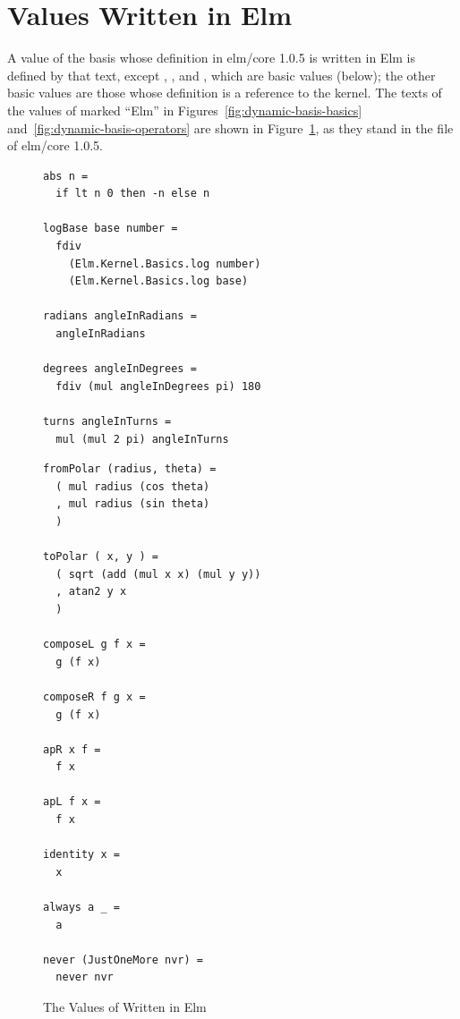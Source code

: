 \section{Values Written in Elm}\label{sec:appendix-dynamic-basis-elm}

A value of the basis whose definition in elm/core 1.0.5 is written in Elm is
defined by that text, except , ,  and
, which are basic values (below); the other basic values are
those whose definition is a reference to the kernel. %
The texts of the values of  marked ``Elm'' in
Figures~\ref{fig:dynamic-basis-basics} and~\ref{fig:dynamic-basis-operators}
are shown in Figure~\ref{fig:dynamic-basis-elm}, as they stand in the file
 of elm/core 1.0.5.

\begin{figure}[htbp]
\centering
\small
\begin{minipage}[t]{0.48\textwidth}
\footnotesize
\begin{verbatim}
abs n =
  if lt n 0 then -n else n

logBase base number =
  fdiv
    (Elm.Kernel.Basics.log number)
    (Elm.Kernel.Basics.log base)

radians angleInRadians =
  angleInRadians

degrees angleInDegrees =
  fdiv (mul angleInDegrees pi) 180

turns angleInTurns =
  mul (mul 2 pi) angleInTurns
\end{verbatim}
\end{minipage}\hfill
\begin{minipage}[t]{0.48\textwidth}
\footnotesize
\begin{verbatim}
fromPolar (radius, theta) =
  ( mul radius (cos theta)
  , mul radius (sin theta)
  )

toPolar ( x, y ) =
  ( sqrt (add (mul x x) (mul y y))
  , atan2 y x
  )

composeL g f x =
  g (f x)

composeR f g x =
  g (f x)

apR x f =
  f x

apL f x =
  f x

identity x =
  x

always a _ =
  a

never (JustOneMore nvr) =
  never nvr
\end{verbatim}
\end{minipage}
\caption{The Values of  Written in Elm}\label{fig:dynamic-basis-elm}
\end{figure}

